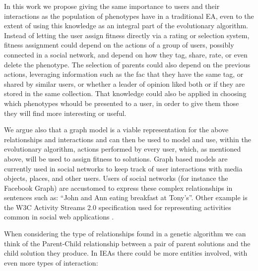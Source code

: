 \documentclass[conference]{IEEEtran}
\begin{document}
In this work we propose giving the same
importance to users and their interactions as the population of 
phenotypes have in a traditional EA, even to the extent of using this
knowledge as an integral part of the evolutionary algorithm.
Instead of letting the user assign fitness directly via a rating
or selection system, fitness assignment could depend on the actions of
a group of users, possibly connected in a social network, and depend on how 
they tag, share, rate, or even delete the phenotype. The selection of parents could
also depend on the previous actions, leveraging information such as the fac that  they have the same tag, or shared by
similar users, or whether a leader of opinion liked both or if they are stored in the same collection.
That knowledge could also be applied in choosing which phenotypes whould be presented to a
user, in order to give them those they will find more interesting or useful. 

We argue also
that a graph model is a viable representation for the above relationships and
interactions and can then be used to model and use, within the
evolutionary algorithm, actions performed by every user, which, as
mentioned above, will be used to assign fitness to solutions. Graph based
models are currently used in social networks to keep track  
of user interactions with media objects, places, and other users. Users of
social networks (for instance the Facebook Graph) are accustomed to express these 
complex relationships in sentences such as: ``John and Ann eating breakfast at Tony's''. 
Other example is the W3C Activity Streams 2.0 specification used for representing activities 
common in social web applications \cite{json:streams}.


When considering the type of relationships found in a genetic algorithm 
we can think of the Parent-Child relationship between a pair of parent solutions and
the child solution they produce. In IEAs there could be more entities involved, with 
even more types of interaction:
\end{document}
